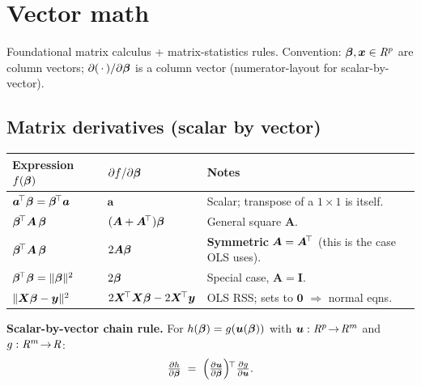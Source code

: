 \section{Vector math}

Foundational matrix calculus + matrix-statistics rules.
Convention: $\bm{\beta},\bm{x} \in \mathit{R}^{p}$ are column vectors;
$\partial(\,\cdot\,)/\partial\bm{\beta}$ is a column vector
(numerator-layout for scalar-by-vector).

\subsection{Matrix derivatives (scalar by vector)}

\begin{center}
\renewcommand{\arraystretch}{1.25}
\begin{tabularx}{\linewidth}{@{}l l X@{}}
\toprule
\textbf{Expression $f(\bm{\beta})$} & \textbf{$\partial f/\partial \bm{\beta}$} & \textbf{Notes} \\
\midrule
$\bm{a}^{\!\top} \bm{\beta} = \bm{\beta}^{\!\top} \bm{a}$ & $\bm{a}$
  & Scalar; transpose of a $1{\times}1$ is itself. \\
$\bm{\beta}^{\!\top} \bm{A}\, \bm{\beta}$ & $(\bm{A} + \bm{A}^{\!\top})\bm{\beta}$
  & General square $\bm{A}$. \\
$\bm{\beta}^{\!\top} \bm{A}\, \bm{\beta}$ & $2\bm{A}\bm{\beta}$
  & \textbf{Symmetric} $\bm{A}=\bm{A}^{\!\top}$ (this is the case OLS uses). \\
$\bm{\beta}^{\!\top} \bm{\beta} = \|\bm{\beta}\|^2$ & $2\bm{\beta}$
  & Special case, $\bm{A}=\bm{I}$. \\
$\|\bm{X}\bm{\beta} - \bm{y}\|^2$ & $2\bm{X}^{\!\top}\bm{X}\bm{\beta} - 2\bm{X}^{\!\top}\bm{y}$
  & OLS RSS; sets to $\bm{0}$ $\Rightarrow$ normal eqns. \\
\bottomrule
\end{tabularx}
\end{center}

\textbf{Scalar-by-vector chain rule.} For $h(\bm{\beta}) = g(\bm{u}(\bm{\beta}))$
with $\bm{u}:\mathit{R}^p\!\to\!\mathit{R}^m$ and $g:\mathit{R}^m\!\to\!\mathit{R}$:
$$\tfrac{\partial h}{\partial \bm{\beta}} \;=\;
\left(\tfrac{\partial \bm{u}}{\partial \bm{\beta}}\right)\!^{\!\top}
\tfrac{\partial g}{\partial \bm{u}}.$$

